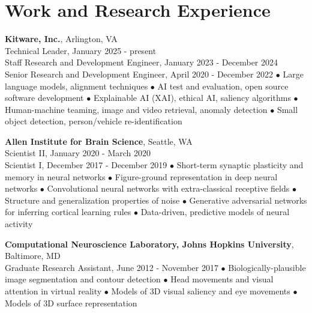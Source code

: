 \documentclass[10pt,letterpaper]{article}
\renewenvironment{itemize}{
  \begin{list}{}{
    \setlength{\leftmargin}{1.5em}
    \setlength{\itemsep}{0.25em}
    \setlength{\parskip}{0pt}
    \setlength{\parsep}{0.25em}
  }
}{
  \end{list}
}
\begin{document}
\section*{Work and Research Experience}
\vspace{-0.05in}
\begin{itemize}
  \item \textbf{Kitware, Inc.}, Arlington, VA\\
  \noindent Technical Leader, January 2025 - present\\
  \noindent Staff Research and Development Engineer, January 2023 - December 2024\\
  \noindent Senior Research and Development Engineer, April 2020 - December 2022
  \subitem$\bullet$ Large language models, alignment techniques
  \subitem$\bullet$ AI test and evaluation, open source software development
  \subitem$\bullet$ Explainable AI (XAI), ethical AI, saliency algorithms
  \subitem$\bullet$ Human-machine teaming, image and video retrieval, anomaly detection
  \subitem$\bullet$ Small object detection, person/vehicle re-identification

  \item \textbf{Allen Institute for Brain Science}, Seattle, WA\\
  \noindent Scientist II, January 2020 - March 2020\\
  \noindent Scientist I, December 2017 - December 2019
  \subitem$\bullet$ Short-term synaptic plasticity and memory in neural networks
  \subitem$\bullet$ Figure-ground representation in deep neural networks
  \subitem$\bullet$ Convolutional neural networks with extra-classical receptive fields
  \subitem$\bullet$ Structure and generalization properties of noise
  \subitem$\bullet$ Generative adversarial networks for inferring cortical learning rules
  \subitem$\bullet$ Data-driven, predictive models of neural activity
  
  \item \textbf{Computational Neuroscience Laboratory, Johns Hopkins University}, Baltimore, MD\\
  \noindent Graduate Research Assistant, June 2012 - November 2017
  \subitem$\bullet$ Biologically-plausible image segmentation and contour detection
  \subitem$\bullet$ Head movements and visual attention in virtual reality
  \subitem$\bullet$ Models of 3D visual saliency and eye movements
  \subitem$\bullet$ Models of 3D surface representation
\end{itemize}

\vspace{-0.25in}
\end{document}
